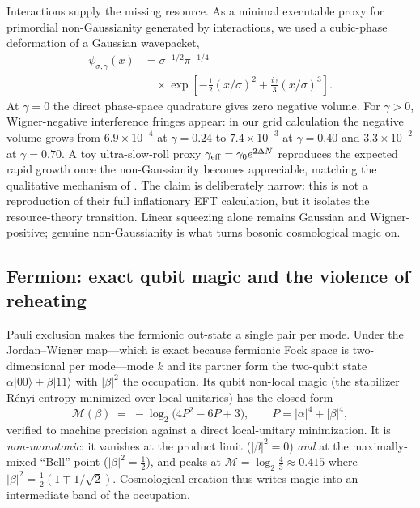 \documentclass[11pt]{article}
\newcommand{\ket}[1]{\lvert #1 \rangle}
\begin{document}
Interactions supply the missing resource. As a minimal executable proxy for
primordial non-Gaussianity generated by interactions, we used a cubic-phase
deformation of a Gaussian wavepacket,
\begin{equation}
  \begin{aligned}
  \psi_{\sigma,\gamma}(x)
  &= \sigma^{-1/2}\pi^{-1/4} \\
  &\quad{}\times
    \exp\!\left[-\frac{1}{2}(x/\sigma)^2
      +\frac{i\gamma}{3}(x/\sigma)^3\right].
  \end{aligned}
\end{equation}
At $\gamma=0$ the direct phase-space quadrature gives zero negative volume.
For $\gamma>0$, Wigner-negative interference fringes appear: in our grid
calculation the negative volume grows from $6.9\times10^{-4}$ at
$\gamma=0.24$ to $7.4\times10^{-3}$ at $\gamma=0.40$ and
$3.3\times10^{-2}$ at $\gamma=0.70$. A toy ultra-slow-roll proxy
$\gamma_{\rm eff}=\gamma_0 e^{2\Delta N}$ reproduces the expected rapid
growth once the non-Gaussianity becomes appreciable, matching the qualitative
mechanism of \citet{ireland_vennin}. The claim is deliberately narrow: this
is not a reproduction of their full inflationary EFT calculation, but it
isolates the resource-theory transition. Linear squeezing alone remains
Gaussian and Wigner-positive; genuine non-Gaussianity is what turns bosonic
cosmological magic on.

\subsection{Fermion: exact qubit magic and the violence of reheating}
Pauli exclusion makes the fermionic out-state a single pair per mode. Under
the Jordan--Wigner map---which is exact because fermionic Fock space is
two-dimensional per mode---mode $k$ and its partner form the two-qubit state
$\alpha\ket{00}+\beta\ket{11}$ with $|\beta|^2$ the occupation. Its qubit
non-local magic (the stabilizer Rényi entropy minimized over local
unitaries) has the closed form
\begin{equation}
  \mathcal{M}(\beta) \;=\; -\log_2\!\big(4P^2-6P+3\big),
  \qquad P=|\alpha|^4+|\beta|^4,
\end{equation}
verified to machine precision against a direct local-unitary minimization.
It is \emph{non-monotonic}: it vanishes at the product limit
($|\beta|^2=0$) \emph{and} at the maximally-mixed ``Bell'' point
($|\beta|^2=\tfrac12$), and peaks at $\mathcal{M}=\log_2\tfrac43\approx0.415$
where $|\beta|^2=\tfrac12(1\mp1/\sqrt2)$. Cosmological creation thus writes
magic into an intermediate band of the occupation.
\end{document}
